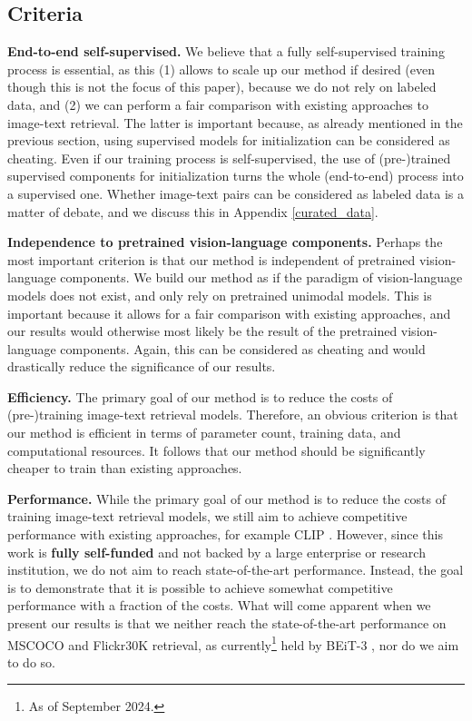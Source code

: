 \documentclass[10pt]{article} %
\begin{document}
\subsection{Criteria}
\textbf{End-to-end self-supervised.} We believe that a fully self-supervised training process is essential, as this (1) allows to scale up our
method if desired (even though this is not the focus of this paper), because we do not rely on labeled data, and (2) we can perform a fair
comparison with existing approaches to image-text retrieval. The latter is important because, as already mentioned in the previous section,
using supervised models for initialization can be considered as cheating. Even if our training process is self-supervised, the use of
(pre-)trained supervised components for initialization turns the whole (end-to-end) process into a supervised one. Whether image-text pairs
can be considered as labeled data is a matter of debate, and we discuss this in Appendix \ref{curated_data}.

\textbf{Independence to pretrained vision-language components.} Perhaps the most important criterion is that our method is independent of
pretrained vision-language components. We build our method as if the paradigm of vision-language models does not exist, and only rely on
pretrained unimodal models. This is important because it allows for a fair comparison with existing approaches, and our results would otherwise
most likely be the result of the pretrained vision-language components. Again, this can be considered as cheating and would drastically reduce
the significance of our results.

\textbf{Efficiency.} The primary goal of our method is to reduce the costs of (pre-)training image-text retrieval models. Therefore, an
obvious criterion is that our method is efficient in terms of parameter count, training data, and computational resources. It follows that
our method should be significantly cheaper to train than existing approaches.

\textbf{Performance.} While the primary goal of our method is to reduce the costs of training image-text retrieval models, we still aim to
achieve competitive performance with existing approaches, for example CLIP \citep{clip}. However, since this work is \textbf{fully self-funded}
and not backed by a large enterprise or research institution, we do not aim to reach state-of-the-art performance. Instead, the goal is to
demonstrate that it is possible to achieve somewhat competitive performance with a fraction of the costs. What will come apparent when we
present our results is that we neither reach the state-of-the-art performance on MSCOCO \citep{coco} and Flickr30K \citep{flickr30k}
retrieval, as currently\footnote{As of September 2024.} held by BEiT-3 \citep{beit3}, nor do we aim to do so.
\end{document}
